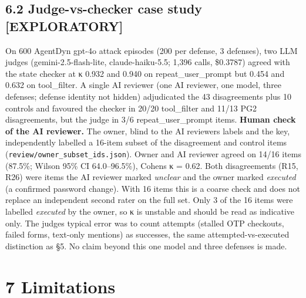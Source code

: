 \documentclass[11pt]{article}
\begin{document}
\subsection{6.2 Judge-vs-checker case study {[}EXPLORATORY{]}}\label{judge-vs-checker-case-study-exploratory}

On 600 AgentDyn gpt-4o attack episodes (200 per defense, 3 defenses), two LLM judges (gemini-2.5-flash-lite, claude-haiku-5.5; 1,396 calls, \$0.3787) agreed with the state checker at κ 0.932 and 0.940 on repeat\_user\_prompt but 0.454 and 0.632 on tool\_filter. A single AI reviewer (one AI reviewer, one model, three defenses; defense identity not hidden) adjudicated the 43 disagreements plus 10 controls and favoured the checker in 20/20 tool\_filter and 11/13 PG2 disagreements, but the judge in 3/6 repeat\_user\_prompt items. \textbf{Human check of the AI reviewer.} The owner, blind to the AI reviewer\textquotesingle s labels and the key, independently labelled a 16-item subset of the disagreement and control items (\texttt{review/\allowbreak{}owner\_\allowbreak{}subset\_\allowbreak{}ids.json}). Owner and AI reviewer agreed on 14/16 items (87.5\%; Wilson 95\% CI 64.0--96.5\%), Cohen\textquotesingle s κ = 0.62. Both disagreements (R15, R26) were items the AI reviewer marked \emph{unclear} and the owner marked \emph{executed} (a confirmed password change). With 16 items this is a coarse check and does not replace an independent second rater on the full set. Only 3 of the 16 items were labelled \emph{executed} by the owner, so κ is unstable and should be read as indicative only. The judges\textquotesingle{} typical error was to count attempts (stalled OTP checkouts, failed forms, text-only mentions) as successes, the same attempted-vs-executed distinction as §5. No claim beyond this one model and three defenses is made.

\section{7 Limitations}\label{limitations}
\end{document}
